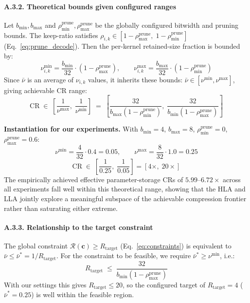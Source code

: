 \documentclass[preprint,12pt,authoryear]{elsarticle}
\begin{document}
\paragraph{A.3.2. Theoretical bounds given configured ranges}
Let $b_{\min}, b_{\max}$ and $\rho_{\min}^{\mathrm{prune}}, \rho_{\max}^{\mathrm{prune}}$
be the globally configured bitwidth and pruning bounds. The keep-ratio satisfies
$\rho_{i,k} \in [1 - \rho_{\max}^{\mathrm{prune}},\; 1 - \rho_{\min}^{\mathrm{prune}}]$
(Eq.~\eqref{eq:prune_decode}). Then the per-kernel retained-size fraction is bounded by:
\begin{equation}
    \nu_{i,k}^{\min} = \frac{b_{\min}}{32} \cdot (1 - \rho_{\max}^{\mathrm{prune}}),
    \qquad
    \nu_{i,k}^{\max} = \frac{b_{\max}}{32} \cdot (1 - \rho_{\min}^{\mathrm{prune}})
\end{equation}
Since $\bar{\nu}$ is an average of $\nu_{i,k}$ values, it inherits these bounds:
$\bar{\nu} \in [\nu^{\min}, \nu^{\max}]$, giving achievable CR range:
\begin{equation}
    \mathrm{CR} \;\in\;
    \left[\frac{1}{\nu^{\max}},\;\frac{1}{\nu^{\min}}\right]
    \;=\;
    \left[
        \frac{32}{b_{\max}(1-\rho_{\min}^{\mathrm{prune}})},\;
        \frac{32}{b_{\min}(1-\rho_{\max}^{\mathrm{prune}})}
    \right]
\end{equation}

\noindent\textbf{Instantiation for our experiments.} With
$b_{\min}=4$, $b_{\max}=8$, $\rho_{\min}^{\mathrm{prune}}=0$,
$\rho_{\max}^{\mathrm{prune}}=0.6$:
\begin{equation}
    \nu^{\min} = \frac{4}{32} \cdot 0.4 = 0.05, \qquad
    \nu^{\max} = \frac{8}{32} \cdot 1.0 = 0.25
\end{equation}
\begin{equation}
    \mathrm{CR} \;\in\; \left[\frac{1}{0.25},\; \frac{1}{0.05}\right]
    = [4\times,\; 20\times]
\end{equation}
The empirically achieved effective parameter-storage CRs of $5.99$--$6.72\times$ across
all experiments fall well within this theoretical range, showing that the HLA and LLA
jointly explore a meaningful subspace of the achievable compression frontier rather than
saturating either extreme.

\paragraph{A.3.3. Relationship to the target constraint}
The global constraint $\mathcal{R}(\mathbf{c}) \geq R_{\mathrm{target}}$
(Eq.~\eqref{eq:constraints}) is equivalent to $\bar{\nu} \leq \bar{\nu}^* = 1/R_{\mathrm{target}}$.
For the constraint to be feasible, we require $\bar{\nu}^* \geq \nu^{\min}$, i.e.:
\begin{equation}
    R_{\mathrm{target}} \;\leq\; \frac{32}{b_{\min}(1-\rho_{\max}^{\mathrm{prune}})}
\end{equation}
With our settings this gives $R_{\mathrm{target}} \leq 20$, so the configured target
of $R_{\mathrm{target}} = 4$ ($\bar{\nu}^* = 0.25$) is well within the feasible region.
\end{document}
